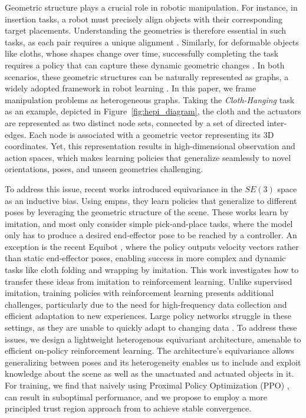 Geometric structure plays a crucial role in robotic manipulation. For instance, in insertion tasks, a robot must precisely align objects with their corresponding target placements. Understanding the geometries is therefore essential in such tasks, as each pair requires a unique alignment \citep{zeng2020transporter, tang2024automate}. Similarly, for deformable objects like cloths, whose shapes change over time, successfully completing the task requires a policy that can capture these dynamic geometric changes \citep{softgym, antonova2021dedo, robocraft}. In both scenarios, these geometric structures can be naturally represented as graphs, a widely adopted framework in robot learning \citep{wang2018nervenet, huang2020smp, ryu2023diffusion, robocraft}. In this paper, we frame manipulation problems as heterogeneous graphs. Taking the \textit{Cloth-Hanging} task as an example, depicted in Figure~\ref{fig:hepi_diagram}, the cloth and the actuators are represented as two distinct node sets, connected by a set of directed inter-edges. Each node is associated with a geometric vector representing its 3D coordinates. Yet, this representation results in high-dimensional observation and action spaces, which makes learning policies that generalize seamlessly to novel orientations, poses, and unseen geometries challenging.

To address this issue, recent works \citep{zeng2020transporter,huang2022equi-trans,huang2024fourier,ryu2023diffusion} introduced equivariance in the $SE(3)$ space as an inductive bias.
Using \glspl{empn}, they learn policies that generalize to different poses by leveraging the geometric structure of the scene.
These works learn by imitation, and most only consider simple pick-and-place tasks, where the model only has to produce a desired end-effector pose to be reached by a controller. 
An exception is the recent Equibot \citep{yang2024equibot}, where the policy outputs velocity vectors rather than static end-effector poses, enabling success in more complex and dynamic tasks like cloth folding and wrapping by imitation. 
This work investigates how to transfer these ideas from imitation to reinforcement learning. 
Unlike supervised imitation, training policies with reinforcement learning presents additional challenges, particularly due to the need for high-frequency data collection and efficient adaptation to new experiences. Large policy networks struggle in these settings, as they are unable to quickly adapt to changing data \citep{andrychowicz2021what}. To address these issues, we design a lightweight heterogenous equivariant architecture, amenable to efficient on-policy reinforcement learning.
The architecture's equivariance allows generalizing between poses and its heterogeneity enables us to include and exploit knowledge about the scene as well as the unactuated and actuated objects in it. 
For training, we find that naively using Proximal Policy Optimization (PPO) \citep{ppo}, can result in suboptimal performance, and we propose to employ a more principled trust region approach from \cite{otto2021trpl} to achieve stable convergence.  

